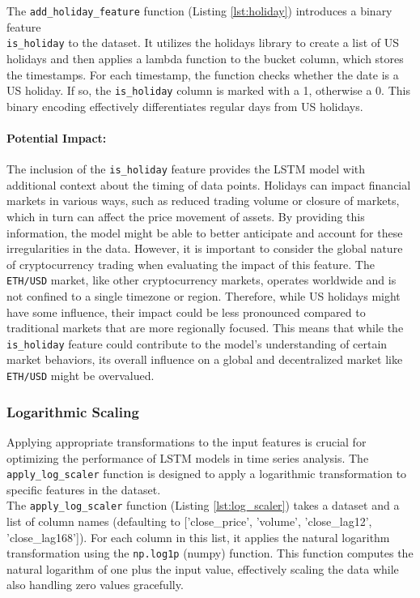 The \texttt{add\_holiday\_feature} function (Listing \ref{lst:holiday}) introduces a binary feature \\ \texttt{is\_holiday} to the dataset. It utilizes the holidays library to create a list of US holidays and then applies a lambda function to the bucket column, which stores the timestamps. For each timestamp, the function checks whether the date is a US holiday. If so, the \texttt{is\_holiday} column is marked with a 1, otherwise a 0. This binary encoding effectively differentiates regular days from US holidays. 

\paragraph{Potential Impact:}
The inclusion of the \texttt{is\_holiday} feature provides the LSTM model with additional context about the timing of data points. Holidays can impact financial markets in various ways, such as reduced trading volume or closure of markets, which in turn can affect the price movement of assets. By providing this information, the model might be able to better anticipate and account for these irregularities in the data.
However, it is important to consider the global nature of cryptocurrency trading when evaluating the impact of this feature. The \texttt{ETH/USD} market, like other cryptocurrency markets, operates worldwide and is not confined to a single timezone or region. Therefore, while US holidays might have some influence, their impact could be less pronounced compared to traditional markets that are more regionally focused. This means that while the \texttt{is\_holiday} feature could contribute to the model's understanding of certain market behaviors, its overall influence on a global and decentralized market like \texttt{ETH/USD} might be overvalued.

\subsubsection{Logarithmic Scaling}

Applying appropriate transformations to the input features is crucial for optimizing the performance of LSTM models in time series analysis. The \texttt{apply\_log\_scaler} function is designed to apply a logarithmic transformation to specific features in the dataset. \\

The \texttt{apply\_log\_scaler} function (Listing \ref{lst:log_scaler}) takes a dataset and a list of column names (defaulting to ['close\_price', 'volume', 'close\_lag12', 'close\_lag168']). For each column in this list, it applies the natural logarithm transformation using the \texttt{np.log1p} (numpy) function. This function computes the natural logarithm of one plus the input value, effectively scaling the data while also handling zero values gracefully. \\

